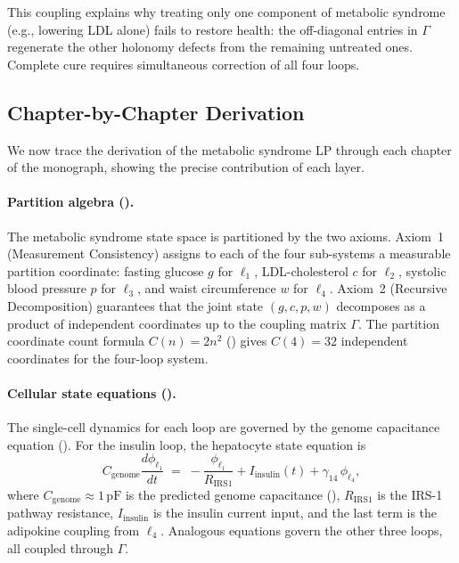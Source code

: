 This coupling explains why treating only one component of metabolic syndrome
(e.g., lowering LDL alone) fails to restore health: the off-diagonal entries
in $\Gamma$ regenerate the other holonomy defects from the remaining untreated
ones.  Complete cure requires simultaneous correction of all four loops.

\subsection{Chapter-by-Chapter Derivation}
\label{subsec:ch11-ms-chapter-derivation}

We now trace the derivation of the metabolic syndrome LP through each chapter
of the monograph, showing the precise contribution of each layer.

\paragraph{Partition algebra ().}
The metabolic syndrome state space is partitioned by the two axioms.
Axiom~1 (Measurement Consistency) assigns to each of the four sub-systems a
measurable partition coordinate: fasting glucose $g$ for $\ell_1$,
LDL-cholesterol $c$ for $\ell_2$, systolic blood pressure $p$ for $\ell_3$,
and waist circumference $w$ for $\ell_4$.  Axiom~2 (Recursive Decomposition)
guarantees that the joint state $(g, c, p, w)$ decomposes as a product of
independent coordinates up to the coupling matrix $\Gamma$.  The partition
coordinate count formula $C(n) = 2n^2$ () gives
$C(4) = 32$ independent coordinates for the four-loop system.

\paragraph{Cellular state equations ().}
The single-cell dynamics for each loop are governed by the genome capacitance
equation ().  For the insulin loop, the
hepatocyte state equation is
\begin{equation}
\label{eq:ch11-hepatocyte-insulin}
  C_{\mathrm{genome}} \frac{d\phi_{\ell_1}}{dt}
  \;=\;
  -\frac{\phi_{\ell_1}}{R_{\mathrm{IRS1}}}
  + I_{\mathrm{insulin}}(t)
  + \gamma_{14}\,\phi_{\ell_4},
\end{equation}
where $C_{\mathrm{genome}} \approx 1\,\mathrm{pF}$ is the predicted genome
capacitance (), $R_{\mathrm{IRS1}}$ is the
IRS-1 pathway resistance, $I_{\mathrm{insulin}}$ is the insulin current
input, and the last term is the adipokine coupling from $\ell_4$.  Analogous
equations govern the other three loops, all coupled through $\Gamma$.

